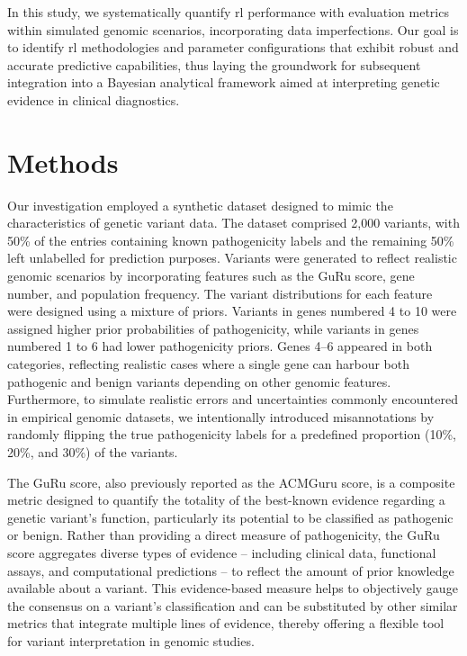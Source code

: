 In this study, we systematically quantify \ac{rl} performance with evaluation metrics within simulated genomic scenarios, incorporating data imperfections. Our goal is to identify \ac{rl} methodologies and parameter configurations that exhibit robust and accurate predictive capabilities, thus laying the groundwork for subsequent integration into a Bayesian analytical framework aimed at interpreting genetic evidence in clinical diagnostics.

\section{Methods}  
Our investigation employed a synthetic dataset designed to mimic the characteristics of genetic variant data. The dataset comprised 2,000 variants, with 50\% of the entries containing known pathogenicity labels and the remaining 50\% left unlabelled for prediction purposes. Variants were generated to reflect realistic genomic scenarios by incorporating features such as the GuRu score, gene number, and population frequency. 
The variant distributions for each feature were designed using a mixture of priors. Variants in genes numbered 4 to 10 were assigned higher prior probabilities of pathogenicity, while variants in genes numbered 1 to 6 had lower pathogenicity priors. Genes 4–6 appeared in both categories, reflecting realistic cases where a single gene can harbour both pathogenic and benign variants depending on other genomic features.
Furthermore, to simulate realistic errors and uncertainties commonly encountered in empirical genomic datasets, we intentionally introduced misannotations by randomly flipping the true pathogenicity labels for a predefined proportion (10\%, 20\%, and 30\%) of the variants.

The GuRu score, also previously reported as the ACMGuru score, is a composite metric designed to quantify the totality of the best-known evidence regarding a genetic variant's function, particularly its potential to be classified as pathogenic or benign. Rather than providing a direct measure of pathogenicity, the GuRu score aggregates diverse types of evidence -- including clinical data, functional assays, and computational predictions -- to reflect the amount of prior knowledge available about a variant. This evidence-based measure helps to objectively gauge the consensus on a variant’s classification and can be substituted by other similar metrics that integrate multiple lines of evidence, thereby offering a flexible tool for variant interpretation in genomic studies.

